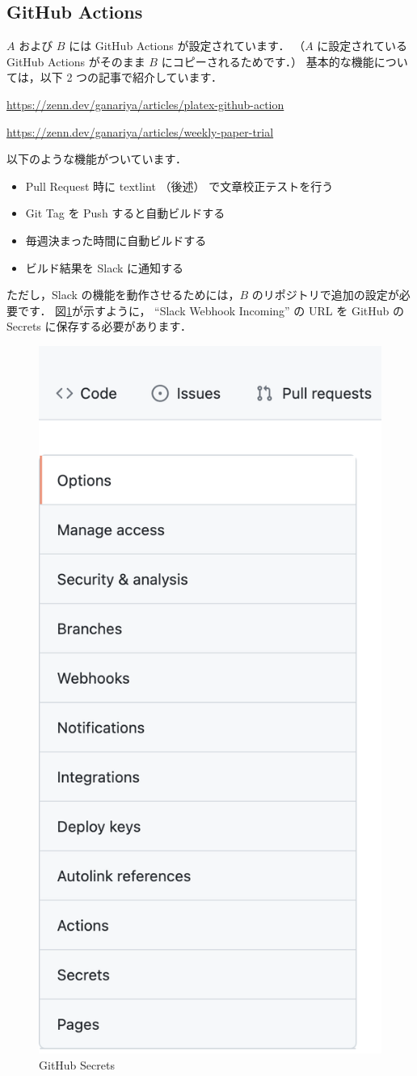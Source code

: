 \subsection{GitHub Actions}

$A$ および $B$ には GitHub Actions が設定されています．
（$A$ に設定されている GitHub Actions がそのまま $B$ にコピーされるためです．）
基本的な機能については，以下 2 つの記事で紹介しています．

\url{https://zenn.dev/ganariya/articles/platex-github-action}

\url{https://zenn.dev/ganariya/articles/weekly-paper-trial}

以下のような機能がついています．

\begin{itemize}
    \item Pull Request 時に textlint （後述） で文章校正テストを行う
    \item Git Tag を Push すると自動ビルドする
    \item 毎週決まった時間に自動ビルドする
    \item ビルド結果を Slack に通知する
\end{itemize}

ただし，Slack の機能を動作させるためには，$B$ のリポジトリで追加の設定が必要です．
図\ref{fig:introduction_secrets}が示すように， ``Slack Webhook Incoming'' の URL を GitHub の Secrets に保存する必要があります．

\begin{figure}[H]
    \centering
    \includegraphics[width=0.3\linewidth]{static/introduction/secrets.png}
    \caption{GitHub Secrets}
    \label{fig:introduction_secrets}
\end{figure}


